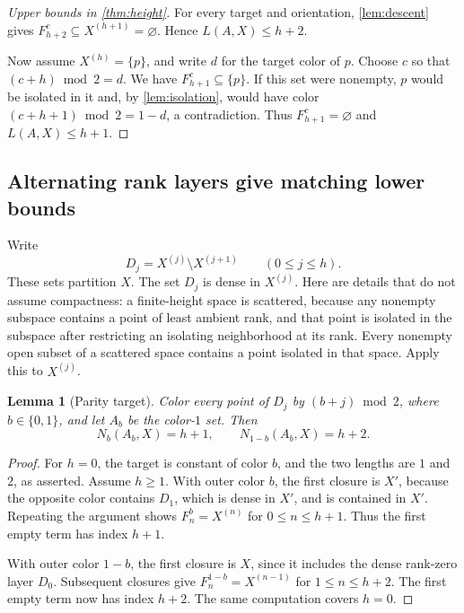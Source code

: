 \documentclass[11pt,letterpaper]{article}
\numberwithin{equation}{section}
\newtheorem{lemma}[lemma]{Lemma}
\theoremstyle{definition}
\theoremstyle{remark}
\begin{document}
\begin{proof}[Upper bounds in \cref{thm:height}]
For every target and orientation, \cref{lem:descent} gives
$F^c_{h+2}\subseteq X^{(h+1)}=\varnothing$. Hence $L(A,X)\leq h+2$.

Now assume $X^{(h)}=\{p\}$, and write $d$ for the target color of $p$.
Choose $c$ so that $(c+h)\bmod2=d$. We have $F^c_{h+1}\subseteq\{p\}$.
If this set were nonempty, $p$ would be isolated in it and, by
\cref{lem:isolation}, would have color $(c+h+1)\bmod2=1-d$, a contradiction.
Thus $F^c_{h+1}=\varnothing$ and $L(A,X)\leq h+1$.
\end{proof}

\subsection{Alternating rank layers give matching lower bounds}

Write
\[
 D_j=X^{(j)}\setminus X^{(j+1)}\qquad(0\leq j\leq h).
\]
These sets partition $X$. The set $D_j$ is dense in $X^{(j)}$. Here are details
that do not assume compactness: a finite-height space is scattered, because any
nonempty subspace contains a point of least ambient rank, and that point is
isolated in the subspace after restricting an isolating neighborhood at its rank.
Every nonempty open subset of a scattered space contains a point isolated in
that space. Apply this to $X^{(j)}$.

\begin{lemma}[Parity target]\label{lem:parity}
Color every point of $D_j$ by $(b+j)\bmod2$, where $b\in\{0,1\}$, and let
$A_b$ be the color-$1$ set. Then
\begin{equation}\label{eq:parityprofiles}
 N_b(A_b,X)=h+1,\qquad N_{1-b}(A_b,X)=h+2.
\end{equation}
\end{lemma}
\begin{proof}
For $h=0$, the target is constant of color $b$, and the two lengths are
$1$ and $2$, as asserted. Assume $h\geq1$.
With outer color $b$, the first closure is $X'$, because the opposite color
contains $D_1$, which is dense in $X'$, and is contained in $X'$.
Repeating the argument shows $F^b_n=X^{(n)}$ for $0\leq n\leq h+1$.
Thus the first empty term has index $h+1$.

With outer color $1-b$, the first closure is $X$, since it includes the dense
rank-zero layer $D_0$. Subsequent closures give
$F^{1-b}_n=X^{(n-1)}$ for $1\leq n\leq h+2$. The first empty term now has
index $h+2$. The same computation covers $h=0$.
\end{proof}
\end{document}
